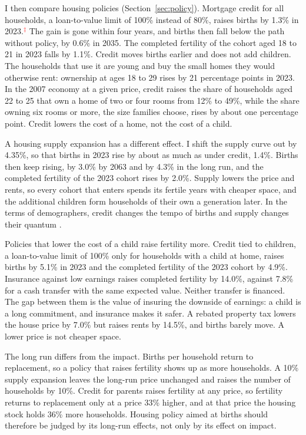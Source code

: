 I then compare housing policies (Section~\ref{sec:policy}). Mortgage credit
for all households, a loan-to-value limit of 100\% instead of 80\%, raises
births by 1.3\% in 2023.\textcolor{red}{$^{\ddagger}$} The gain is gone within
four years, and births then fall below the path without policy, by 0.6\% in
2035. The completed fertility of the cohort aged 18 to 21 in 2023 falls by
1.1\%. Credit moves births earlier and does not add children. The households
that use it are young and buy the small homes they would otherwise rent:
ownership at ages 18 to 29 rises by 21 percentage points in 2023. In the 2007
economy at a given price, credit raises the share of households aged 22 to 25
that own a home of two or four rooms from 12\% to 49\%, while the share
owning six rooms or more, the size families choose, rises by about one
percentage point. Credit lowers the cost of a home, not the cost of a child.

A housing supply expansion has a different effect. I shift the supply curve
out by 4.35\%, so that births in 2023 rise by about as much as under credit,
1.4\%. Births then keep rising, by 3.0\% by 2063 and by 4.3\% in the long
run, and the completed fertility of the 2023 cohort rises by 2.0\%. Supply
lowers the price and rents, so every cohort that enters spends its fertile
years with cheaper space, and the additional children form households of
their own a generation later. In the terms of demographers, credit changes
the tempo of births and supply changes their quantum
\citep{bongaartsFeeneyQuantumTempo1998}.

Policies that lower the cost of a child raise fertility more. Credit tied to
children, a loan-to-value limit of 100\% only for households with a child at
home, raises births by 5.1\% in 2023 and the completed fertility of the 2023
cohort by 4.9\%. Insurance against low earnings raises completed fertility
by 14.0\%, against 7.8\% for a cash transfer with the same expected value.
Neither transfer is financed. The gap between them is the value of insuring
the downside of earnings: a child is a long commitment, and insurance makes it
safer. A rebated property
tax lowers the house price by 7.0\% but raises rents by 14.5\%, and births
barely move. A lower price is not cheaper space.

The long run differs from the impact. Births per household return to
replacement, so a policy that raises fertility shows up as more households. A
10\% supply expansion leaves the long-run price unchanged and raises the
number of households by 10\%. Credit for parents raises fertility at any
price, so fertility returns to replacement only at a price 33\% higher, and
at that price the housing stock holds 36\% more households. Housing policy aimed at births should therefore be judged by its
long-run effects, not only by its effect on impact.

